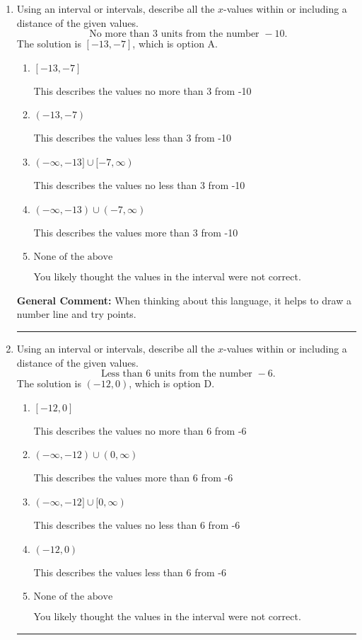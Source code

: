 \documentclass{extbook}[14pt]
\newcommand{\litem}[1]{\item #1

\rule{\textwidth}{0.4pt}}
\begin{document}
\begin{enumerate}\litem{
Using an interval or intervals, describe all the $x$-values within or including a distance of the given values.
\[ \text{ No more than } 3 \text{ units from the number } -10. \]The solution is \( [-13, -7] \), which is option A.\begin{enumerate}[label=\Alph*.]
\item \( [-13, -7] \)

This describes the values no more than 3 from -10
\item \( (-13, -7) \)

This describes the values less than 3 from -10
\item \( (-\infty, -13] \cup [-7, \infty) \)

This describes the values no less than 3 from -10
\item \( (-\infty, -13) \cup (-7, \infty) \)

This describes the values more than 3 from -10
\item \( \text{None of the above} \)

You likely thought the values in the interval were not correct.
\end{enumerate}

\textbf{General Comment:} When thinking about this language, it helps to draw a number line and try points.
}
\litem{
Using an interval or intervals, describe all the $x$-values within or including a distance of the given values.
\[ \text{ Less than } 6 \text{ units from the number } -6. \]The solution is \( (-12, 0) \), which is option D.\begin{enumerate}[label=\Alph*.]
\item \( [-12, 0] \)

This describes the values no more than 6 from -6
\item \( (-\infty, -12) \cup (0, \infty) \)

This describes the values more than 6 from -6
\item \( (-\infty, -12] \cup [0, \infty) \)

This describes the values no less than 6 from -6
\item \( (-12, 0) \)

This describes the values less than 6 from -6
\item \( \text{None of the above} \)

You likely thought the values in the interval were not correct.
\end{enumerate}

}
\end{enumerate}
\end{document}
